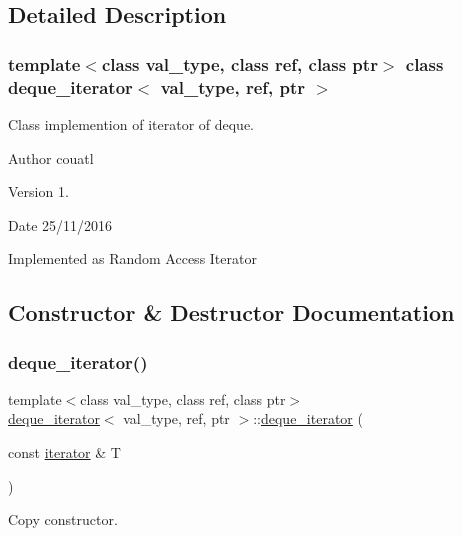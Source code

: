 \subsection{Detailed Description}
\subsubsection*{template$<$class val\+\_\+type, class ref, class ptr$>$\newline
class deque\+\_\+iterator$<$ val\+\_\+type, ref, ptr $>$}

Class implemention of iterator of deque. 

\begin{DoxyAuthor}{Author}
couatl 
\end{DoxyAuthor}
\begin{DoxyVersion}{Version}
1. 
\end{DoxyVersion}
\begin{DoxyDate}{Date}
25/11/2016
\end{DoxyDate}
Implemented as Random Access Iterator 

\subsection{Constructor \& Destructor Documentation}
\hypertarget{structdeque__iterator_acaad7042cd8df81283bd4834ba07ad30}{}\label{structdeque__iterator_acaad7042cd8df81283bd4834ba07ad30} 
\subsubsection{\texorpdfstring{deque\+\_\+iterator()}{deque\_iterator()}}
{\footnotesize\ttfamily template$<$class val\+\_\+type, class ref, class ptr$>$ \\
\hyperlink{structdeque__iterator}{deque\+\_\+iterator}$<$ val\+\_\+type, ref, ptr $>$\+::\hyperlink{structdeque__iterator}{deque\+\_\+iterator} (\begin{DoxyParamCaption}\item[{const \hyperlink{structdeque__iterator}{iterator} \&}]{T }\end{DoxyParamCaption})\hspace{0.3cm}{\ttfamily [inline]}}



Copy constructor. 

